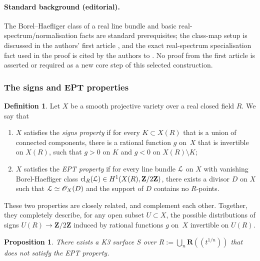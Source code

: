\documentclass[11pt]{article}
\newcommand{\Subsubsection}{\subsubsection}
\let\mathcal\EuScript
\newcommand{\lpr}{(\!(}
\newcommand{\rpr}{)\!)}
\theoremstyle{plain}
\newtheorem{prop}[thm]{Proposition}
\theoremstyle{definition}
\newtheorem{defn}[thm]{Definition}
\numberwithin{equation}{section}
\newcommand{\cl}{{\mathrm{cl}}}
\newcommand{\sO}{{\mathscr O}}
\newcommand{\R}{{\mathbf R}}
\newcommand{\Z}{{\mathbf Z}}
\begin{document}
\paragraph{Standard background (editorial).}
The Borel--Haefliger class of a real line bundle and basic real-spectrum/normalisation facts are standard prerequisites; the class-map setup is discussed in the authors' first article \cite{BW1}, and the exact real-spectrum specialisation fact used in the proof is cited by the authors to \cite[Prop.\,7.1.21]{bcr}. No proof from the first article is asserted or required as a new core step of this selected construction.
\setcounter{section}{9}\setcounter{subsection}{3}\setcounter{subsubsection}{0}\setcounter{thm}{14}

\Subsubsection{The signs and EPT properties}
\label{subsubsec:signsEPT}

\begin{defn}
Let $X$ be a smooth projective variety over a real closed field $R$. We say that
\begin{enumerate}
\item $X$ satisfies the \textit{signs property} if for every $K\subset X(R)$ that is a union of connected components, there is a rational function $g$ on~$X$ that is invertible on $X(R)$, such that $g>0$ on $K$ and $g<0$ on $X(R)\setminus K$;
\item $X$ satisfies the \textit{EPT property} if for every line bundle $\mathcal{L}$ on $X$ with vanishing Borel-Haefliger class $\cl_R(\mathcal{L})\in H^1(X(R),\Z/2\Z)$, there exists a divisor $D$ on $X$ such that $\mathcal{L}\simeq\sO_X(D)$ and the support of $D$ contains no $R$-points.
\end{enumerate}
\end{defn}

These two properties are closely related, and complement each other. Together, they completely describe, for any open subset $U\subset X$, the possible distributions of signs $U(R)\to \Z/2\Z$ induced by rational functions $g$ on~$X$ invertible on $U(R)$.


\setcounter{thm}{16}\setcounter{equation}{3}

\begin{prop}
\label{prop:cexEPT}
There exists a K3 surface $S$ over $R:=\bigcup_n\R\lpr t^{1/n}\rpr$ that does not satisfy the EPT property.
\end{prop}
\end{document}
